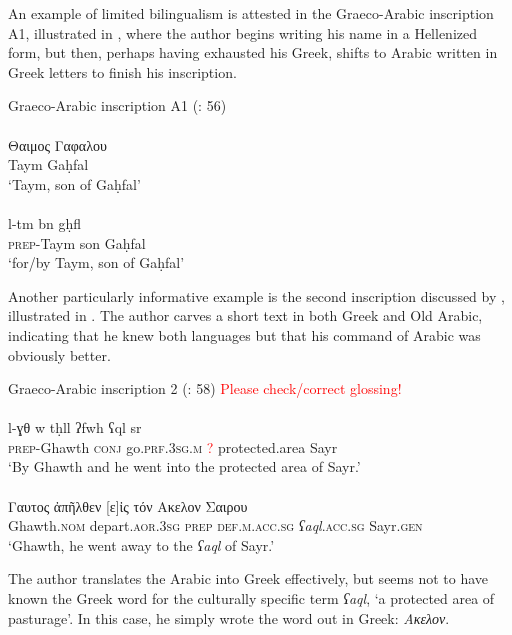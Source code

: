 \documentclass[output=paper]{langsci/langscibook}
\begin{document}
An example of limited bilingualism is attested in the Graeco-Arabic inscription A1, illustrated in , where the author begins writing his name in a Hellenized form, but then, perhaps having exhausted his Greek, shifts to Arabic written in Greek letters to finish his inscription.

\ea Graeco-Arabic inscription A1 (\citealt{Al-Jalladal-Manaser2016}: 56)\label{Taym}\\
 \\ 
\gll    Θαιμος Γαφαλου \\
        Taym Gaḥfal\\
\glt `Taym, son of Gaḥfal'\\

 \\
\gll   l-tm bn gḥfl \\
       \textsc{prep}-Taym son Gaḥfal \\
\glt `for/by Taym, son of Gaḥfal'\\
\z
\z

 Another particularly informative example is the second inscription discussed by \citet{Al-Jalladal-Manaser2016}, illustrated in . The author carves a short text in both Greek and Old Arabic, indicating that he knew both languages but that his command of Arabic was obviously better.

\ea Graeco-Arabic inscription 2 (\citealt{Al-Jalladal-Manaser2016}: 58) \textcolor{red}{Please check/correct glossing!}\label{Ghawth}\\
 \\
\gll   l-ɣθ w tḥll ʔfwh ʕql sr \\
       \textsc{prep}-Ghawth \textsc{conj} go.\textsc{prf.3sg.m} \textcolor{red}{?} protected.area Sayr \\
\glt `By Ghawth and he went into the protected area of Sayr.'\\
 \\ 
\gll    Γαυτος ἀπῆλθεν [ε]ἰς τόν Ακελον Σαιρου \\
Ghawth.\textsc{nom} depart.\textsc{aor.3sg} \textsc{prep} \textsc{def.m.acc.sg} \textit{ʕaql}.\textsc{acc.sg} Sayr.\textsc{gen}\\ 
\glt `Ghawth, he went away to the \textit{ʕaql} of Sayr.'\\
\z
\z

The author translates the Arabic into Greek effectively, but seems not to have known the Greek word for the culturally specific term \textit{ʕaql}, ‘a protected area of pasturage’. In this case, he simply wrote the word out in Greek: \textit{Ακελον}.
\end{document}
